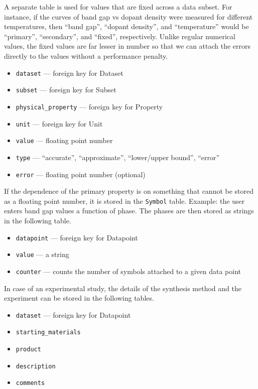 \documentclass{article}
\begin{document}
A separate table is used for values that are fixed across a data subset. For instance, if the curves of band gap vs dopant density were measured for different temperatures, then ``band gap'', ``dopant density'', and ``temperature'' would be ``primary'', ``secondary'', and ``fixed'', respectively. Unlike regular numerical values, the fixed values are far lesser in number so that we can attach the errors directly to the values without a performance penalty.
\begin{tcolorbox}[colback=green!5,colframe=green!40!black,title=NumericalValueFixed(Base)]
  \begin{itemize}
  \item \texttt{dataset} --- foreign key for Dataset
  \item \texttt{subset} --- foreign key for Subset
  \item \texttt{physical\_property} --- foreign key for Property
  \item \texttt{unit} --- foreign key for Unit
  \item \texttt{value} --- floating point number
  \item \texttt{type} --- ``accurate'', ``approximate'', ``lower/upper bound'', ``error''
  \item \texttt{error} --- floating point number (optional)
  \end{itemize}
\end{tcolorbox}

If the dependence of the primary property is on something that cannot be stored as a floating point number, it is stored in the \texttt{Symbol} table. Example: the user enters band gap values a function of phase. The phases are then stored as strings in the following table.
\begin{tcolorbox}[colback=green!5,colframe=green!40!black,title=Symbol(Base)]
  \begin{itemize}
  \item \texttt{datapoint} --- foreign key for Datapoint
  \item \texttt{value} --- a string
  \item \texttt{counter} --- counts the number of symbols attached to a given data point
  \end{itemize}
\end{tcolorbox}

In case of an experimental study, the details of the synthesis method and the experiment can be stored in the following tables.
\begin{tcolorbox}[colback=green!5,colframe=green!40!black,title=SynthesisMethod(Base)]
  \begin{itemize}
  \item \texttt{dataset} --- foreign key for Datapoint
  \item \texttt{starting\_materials}
  \item \texttt{product}
  \item \texttt{description}
  \item \texttt{comments}
  \end{itemize}
\end{tcolorbox}
\end{document}
